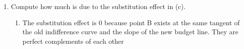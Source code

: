 \documentclass[11pt]{article}
\begin{document}
\begin{enumerate}
\begin{enumerate}
        \item Compute how much is due to the substitution effect in (c).
        \begin{enumerate}
            \item The substitution effect is 0 because point B exists at the same tangent of the old indifference curve and the slope of the new budget line.
            They are perfect complements of each other
        \end{enumerate}

    \end{enumerate}



\end{enumerate}
\end{document}
